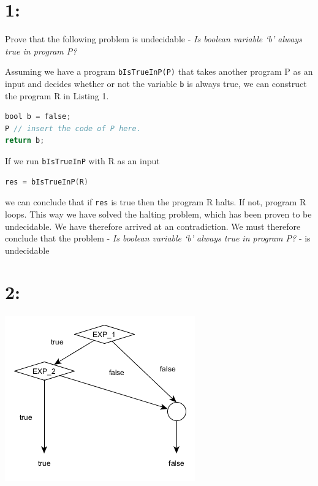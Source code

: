 \documentclass{article}
\begin{document}

\section*{1:}
Prove that the following problem is undecidable - \emph{Is boolean variable ‘b’ always true in program P?}

\noindent Assuming we have a program \texttt{bIsTrueInP(P)} that takes another program P as an input and decides whether or not the variable \texttt{b} is always true, we can construct the program R in Listing 1.
\belowcaptionskip=-10pt
\begin{lstlisting}[caption=R.cs, language=C]
bool b = false;
P // insert the code of P here.
return b;
\end{lstlisting}
If we run \texttt{bIsTrueInP} with R as an input
\begin{lstlisting}[language=C]
res = bIsTrueInP(R)
\end{lstlisting}
we can conclude that if \texttt{res} is true then the program R halts. If not, program R loops. This way we have solved the halting problem, which has been proven to be undecidable. We have therefore arrived at an contradiction. We must therefore conclude that the problem - \emph{Is boolean variable ‘b’ always true in program P?} - is undecidable

\section*{2:}
\includegraphics[scale = 0.8]{graph2.png}
\end{document}
